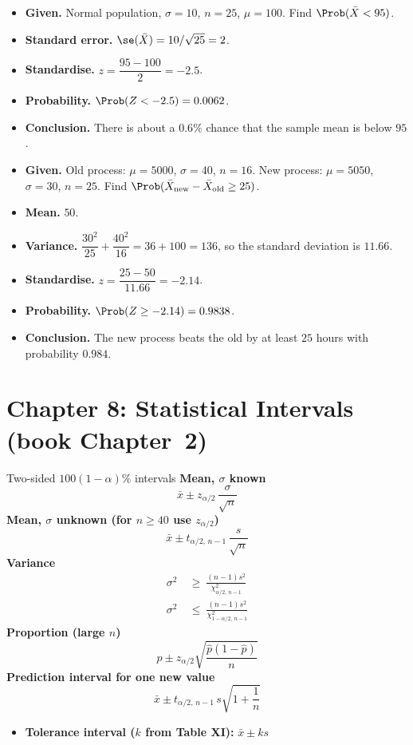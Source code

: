 \begin{example}
\begin{itemize}
  \item \textbf{Given.} Normal population, $\sigma=10$, $n=25$, $\mu=100$. Find $\Prob(\bar{X}<95)$.
  \item \textbf{Standard error.} $\se(\bar{X})=10/\sqrt{25}=2$.
  \item \textbf{Standardise.} $z=\dfrac{95-100}{2}=-2.5$.
  \item \textbf{Probability.} $\Prob(Z<-2.5)=0.0062$.
  \item \textbf{Conclusion.} There is about a $0.6\%$ chance that the sample mean is below $95$.
\end{itemize}
\end{example}

\begin{example}
\begin{itemize}
  \item \textbf{Given.} Old process: $\mu=5000$, $\sigma=40$, $n=16$. New process: $\mu=5050$, $\sigma=30$, $n=25$. Find $\Prob(\bar{X}_{\text{new}}-\bar{X}_{\text{old}}\ge25)$.
  \item \textbf{Mean.} $50$.
  \item \textbf{Variance.} $\dfrac{30^2}{25}+\dfrac{40^2}{16}=36+100=136$, so the standard deviation is $11.66$.
  \item \textbf{Standardise.} $z=\dfrac{25-50}{11.66}=-2.14$.
  \item \textbf{Probability.} $\Prob(Z\ge-2.14)=0.9838$.
  \item \textbf{Conclusion.} The new process beats the old by at least $25$ hours with probability $0.984$.
\end{itemize}
\end{example}

\section{Chapter 8: Statistical Intervals (book Chapter~2)}

\begin{formulabox}{Two-sided $100(1-\alpha)\%$ intervals}
\textbf{Mean, $\sigma$ known}
\[ \bar{x}\pm z_{\alpha/2}\,\frac{\sigma}{\sqrt n} \]
\textbf{Mean, $\sigma$ unknown (for $n\ge40$ use $z_{\alpha/2}$)}
\[ \bar{x}\pm t_{\alpha/2,\,n-1}\,\frac{s}{\sqrt n} \]
\textbf{Variance}
\[ \begin{aligned}\sigma^2&\ \ge\ \frac{(n-1)s^2}{\chi^2_{\alpha/2,\,n-1}}\\[4pt] \sigma^2&\ \le\ \frac{(n-1)s^2}{\chi^2_{1-\alpha/2,\,n-1}}\end{aligned} \]
\textbf{Proportion (large $n$)}
\[ \hat{p}\pm z_{\alpha/2}\sqrt{\frac{\hat{p}(1-\hat{p})}{n}} \]
\textbf{Prediction interval for one new value}
\[ \bar{x}\pm t_{\alpha/2,\,n-1}\,s\sqrt{1+\frac1n} \]
\begin{itemize}
  \item \textbf{Tolerance interval ($k$ from Table XI):} $\bar{x}\pm ks$
\end{itemize}
\end{formulabox}


